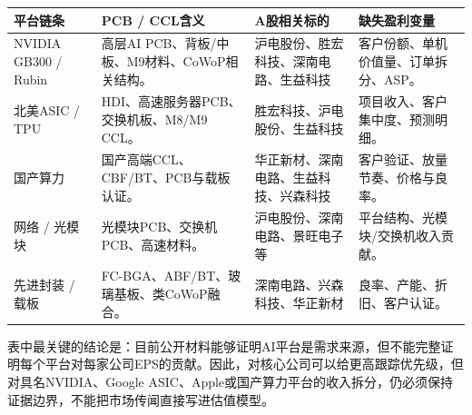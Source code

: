 \begin{exhibitbox}[图表5-1：平台链条盈利桥与证据缺口]
\footnotesize
\begin{tabularx}{\textwidth}{L{2.6cm}X X X}
\toprule
\textbf{平台链条} & \textbf{PCB / CCL含义} & \textbf{A股相关标的} & \textbf{缺失盈利变量} \\
\midrule
NVIDIA GB300 / Rubin & 高层AI PCB、背板/中板、M9材料、CoWoP相关结构。 & 沪电股份、胜宏科技、深南电路、生益科技 & 客户份额、单机价值量、订单拆分、ASP。 \\
北美ASIC / TPU & HDI、高速服务器PCB、交换机板、M8/M9 CCL。 & 胜宏科技、沪电股份、生益科技 & 项目收入、客户集中度、预测明细。 \\
国产算力 & 国产高端CCL、CBF/BT、PCB与载板认证。 & 华正新材、深南电路、生益科技、兴森科技 & 客户验证、放量节奏、价格与良率。 \\
网络 / 光模块 & 光模块PCB、交换机PCB、高速材料。 & 沪电股份、深南电路、景旺电子等 & 平台结构、光模块/交换机收入贡献。 \\
先进封装 / 载板 & FC-BGA、ABF/BT、玻璃基板、类CoWoP融合。 & 深南电路、兴森科技、华正新材 & 良率、产能、折旧、客户认证。 \\
\bottomrule
\end{tabularx}
\end{exhibitbox}

表中最关键的结论是：目前公开材料能够证明AI平台是需求来源，但不能完整证明每个平台对每家公司EPS的贡献。因此，对核心公司可以给更高跟踪优先级，但对具名NVIDIA、Google ASIC、Apple或国产算力平台的收入拆分，仍必须保持证据边界，不能把市场传闻直接写进估值模型。

